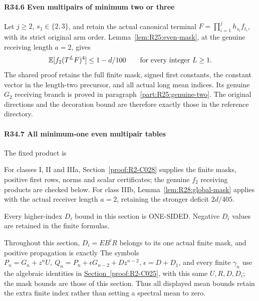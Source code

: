 \paragraph{R34.6 Even multipairs of minimum two or three}

Let \(j\ge2\), \(s_1\in\{2,3\}\), and retain the actual
canonical terminal \(F=\prod_{i=1}^j h_{s_i}f_{t_i}\), with its
strict original arm order. Lemma~\ref{lem:R25:even-mask}, at the
genuine receiving length \(a=2\), gives
\[
 \mathbb E[f_2(T^LF)^4]\le1-d/100
 \qquad\text{for every integer }L\ge1.
\]
The shared proof retains the full finite mask, signed first constants,
the constant vector in the length-two precursor, and all actual
long mean indices. Its genuine \(G_2\) receiving branch is proved
in paragraph~\ref{part:R25:genuine-two}. The original directions
and the decoration bound are therefore exactly those in the
reference directory.

\paragraph{R34.7 All minimum-one even multipair tables}

The fixed product is


For classes I, II and IIIa, Section~\ref{proof:R2-C028} supplies the
finite masks, positive first rows, norms and scalar certificates;
the genuine \(f_2\) receiving products are checked below.
For class IIIb, Lemma~\ref{lem:R28:global-mask} applies with the actual
receiver length \(a=2\), retaining the stronger deficit \(2d/405\).

Every higher-index \(D_i\) bound in this section is ONE-SIDED. Negative
\(D_i\) values are retained in the finite formulas.

Throughout this section, \(D_i=EB^iR\) belongs to its one actual finite
mask, and positive propagation is exactly
The symbols \(P_n=G_n+z^nU,\allowbreak  \ Q_n=P_n+\epsilon G_{n-2}+Dz^{n-2}\),
\(\epsilon=D+D_1\), and every finite \(\gamma_n\) use the algebraic identities in
\hyperref[part:R25:finite-propagation]{Section~\ref{proof:R2-C025}},
with this same \(U,\allowbreak  R,\allowbreak  D,\allowbreak  D_i\); the mask bounds are those of this section.
Thus all displayed mean bounds retain the extra finite index rather than setting a spectral mean to zero.

